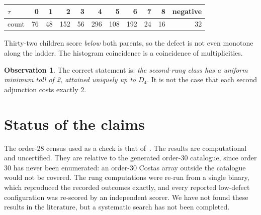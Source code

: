\documentclass[11pt,a4paper,oneside]{report}
\theoremstyle{definition}
\newtheorem{observation}[theorem]{Observation}
\begin{document}
\begin{center}
\begin{tabular}{@{}lrrrrrrrrrr@{}}
\toprule
$\tau$ & 0 & 1 & 2 & 3 & 4 & 5 & 6 & 7 & 8 & negative \\
\midrule
count & 76 & 48 & 152 & 56 & 296 & 108 & 192 & 24 & 16 & 32 \\
\bottomrule
\end{tabular}
\end{center}

Thirty-two children score \emph{below} both parents, so the defect is not even
monotone along the ladder. The histogram coincidence is a coincidence of
multiplicities.

\begin{observation}
The correct statement is: \emph{the second-rung class has a uniform minimum toll
of 2, attained uniquely up to $D_4$}. It is not the case that each second
adjunction costs exactly 2.
\end{observation}


\section{Status of the claims}\label{p2-sec:status}
The order-28 census used as a check is that of~\cite{p2-drakakis28}. The results are computational and uncertified. They are relative to the generated order-30
catalogue, since order 30 has never been enumerated: an order-30 Costas array outside the catalogue
would not be covered. The rung computations were re-run from a single binary, which reproduced the
recorded outcomes exactly, and every reported low-defect configuration was re-scored by an
independent scorer. We have not found these results in the literature, but a systematic search has
not been completed.
\end{document}

